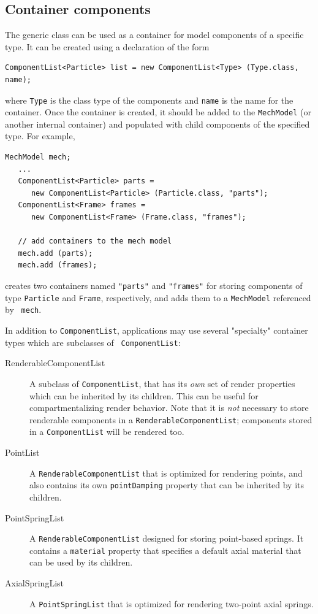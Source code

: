 \subsection{Container components}

The generic class 
can be used as a container for model components of a specific type.
It can be created using a declaration of the form
%
\begin{lstlisting}[]
   ComponentList<Particle> list = new ComponentList<Type> (Type.class, name);
\end{lstlisting}
%
where {\tt Type} is the class type of the components and {\tt name} is
the name for the container. Once the container is created, it should
be added to the {\tt MechModel} (or another internal container) and 
populated with child components of the specified type.
For example,
\begin{lstlisting}[]
   MechModel mech; 
   ...
   ComponentList<Particle> parts = 
      new ComponentList<Particle> (Particle.class, "parts");
   ComponentList<Frame> frames = 
      new ComponentList<Frame> (Frame.class, "frames");

   // add containers to the mech model
   mech.add (parts); 
   mech.add (frames);
\end{lstlisting}
creates two containers named {\tt "parts"} and {\tt "frames"} for
storing components of type {\tt Particle} and {\tt Frame},
respectively, and adds them to a {\tt MechModel} referenced by {\tt
mech}.

In addition to {\tt ComponentList}, applications may use several
"specialty" container types which are subclasses of {\tt
ComponentList}:

\begin{description}

\item[RenderableComponentList]\mbox{}

A subclass of {\tt ComponentList}, that
has its {\it own} set of render properties which can be inherited by
its children. This can be useful for compartmentalizing render
behavior.  Note that it is {\it not} necessary to store renderable
components in a {\tt RenderableComponentList}; components stored in a
{\tt ComponentList} will be rendered too.

\item[PointList]\mbox{}

A {\tt RenderableComponentList} that is optimized for
rendering points, and also contains its own {\tt pointDamping}
property that can be inherited by its children.

\item[PointSpringList]\mbox{}

A {\tt RenderableComponentList} designed for
storing point-based springs. It contains a {\tt material} property that
specifies a default axial material that can be used by its children.

\item[AxialSpringList]\mbox{}

A {\tt PointSpringList} that is optimized for
rendering two-point axial springs.

\end{description}

